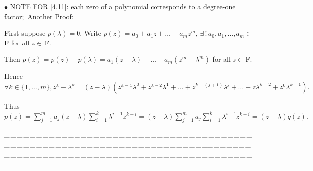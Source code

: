 \documentclass[a4paper, 11pt, UTF8]{article}
\def\Fbf{$\,{\timesbf F}\,$}
\def\Fbfc{$\,{\timesbf F}$}
\begin{document}
\begin{large}
{\small $\bullet$ } {\timesbf\Large N{\normalsize OTE} F{\normalsize OR} [4.11]:} {\timessl each zero of a polynomial corresponds to a degree-one factor;}\,\,\,{\timessl\Large Another Proof:}\par\quad
First suppose $p(\lambda)=0.$ Write $p(z)=a_0+a_1 z+\dots+a_m z^m,\,\exists\,!\,a_0,a_1,\dots,a_m\in\Fbf\,$for all $z\in\Fbfc.$\par\quad
Then $p(z)=p(z)-p(\lambda)=a_1(z-\lambda)+\dots+a_m(z^m-\lambda^m)$ for all $z\in\Fbfc.$\par\quad
Hence $\forall k\in\{1,\dots,m\},z^k-\lambda^k=(z-\lambda)( z^{k-1}\lambda^0+ z^{k-2}\lambda^1+\dots+z^{k-(j+1)}\lambda^j+\dots+z\lambda^{k-2}+z^{0}\lambda^{k-1}).$\par\quad
Thus $p(z)=\sum\limits_{j=1}^m a_j (z-\lambda)\sum\limits_{i=1}^k \lambda^{i-1}z^{k-i}=(z-\lambda)\sum\limits_{j=1}^m a_j\sum\limits_{i=1}^k \lambda^{i-1}z^{k-i}=(z-\lambda)q(z).$
\par
{\tiny \_\,\_\,\_\,\_\,\_\,\_\,\_\,\_\,\_\,\_\,\_\,\_\,\_\,\_\,\_\,\_\,\_\,\_\,\_\,\_\,\_\,\_\,\_\,\_\,\_\,\_\,\_\,\_\,\_\,\_\,\_\,\_\,\_\,\_\,\_\,\_\,\_\,\_\,\_\,\_\,\_\,\_\,\_\,\_\,\_\,\_\,\_\,\_\,\_\,\_\,\_\,\_\,\_\,\_\,\_\,\_\,\_\,\_\,\_\,\_\,\_\,\_\,\_\,\_\,\_\,\_\,\_\,\_\,\_\,\_\,\_\_\,\_\,\_\,\_\,\_\,\_\,\_\,\_\,\_\,\_\,\_\,\_\,\_\,\_\,\_\,\_\,\_\,\_\,\_\,\_\,\_\,\_\,\_\,\_\,\_\,\_\,\_\,\_\,\_\,\_\,\_\,\_\,\_\,\_\,\_\,\_\,\_\,\_\,\_\,\_\,\_\,\_\,\_\,\_\,\_\,\_\,\_\,\_\,\_\,\_\,\_\,\_\,\_\,\_\,\_\,\_\,\_\,\_\,\_\,\_\,\_\,\_\,\_\,\_\,\_\,\_\,\_\,\_\,\_\,\_\,\_}\par


\end{large}
\end{document}
